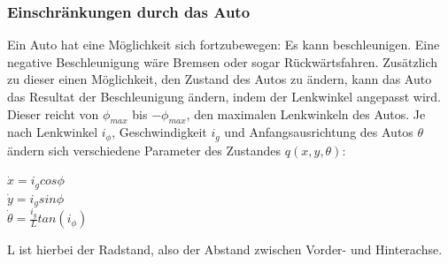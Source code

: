 \subsubsection{Einschränkungen durch das Auto}
Ein Auto hat eine Möglichkeit sich fortzubewegen: Es kann beschleunigen. Eine negative Beschleunigung wäre Bremsen oder sogar Rückwärtsfahren. Zusätzlich zu dieser einen Möglichkeit, den Zustand des Autos zu ändern, kann das Auto das Resultat der Beschleunigung ändern, indem der Lenkwinkel angepasst wird. Dieser reicht von $\phi_{max}$ bis $-\phi_{max}$, den maximalen Lenkwinkeln des Autos.
Je nach Lenkwinkel $i_{\phi}$, Geschwindigkeit $i_g$ und Anfangsausrichtung des Autos $\theta$ ändern sich verschiedene Parameter des Zustandes $q(x,y, \theta) $: \\
\begin{center}
$ \dot{x} = i_g cos \phi $ \\
$ \dot{y} = i_g sin \phi$ \\
$ \dot{{\theta}} = \frac{i_g}{L} tan (i_{\phi}) $
\end{center}
L ist hierbei der Radstand, also der Abstand zwischen Vorder- und Hinterachse. \\


